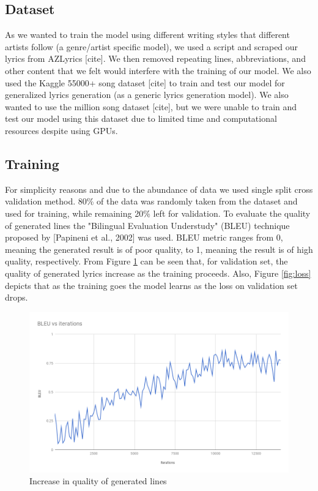 \documentclass{article}
\begin{document}
\subsection{Dataset}

As we wanted to train the model using different writing styles that different artists follow (a genre/artist specific model), we used a script and scraped our lyrics from AZLyrics [cite]. We then removed repeating lines, abbreviations, and other content that we felt would interfere with the training of our model. We also used the Kaggle 55000+ song dataset [cite] to train and test our model for generalized lyrics generation (as a generic lyrics generation model). We also wanted to use the million song dataset [cite], but we were unable to train and test our model using this dataset due to limited time and computational resources despite using GPUs.

\subsection{Training}
For simplicity reasons and due to the abundance of data we used single split cross validation method. 80\% of the data was randomly taken from the dataset and used for training, while remaining 20\% left for validation. To evaluate the quality of generated lines the "Bilingual Evaluation Understudy" (BLEU) technique proposed by [Papineni et al., 2002] was used. BLEU metric ranges from 0, meaning the generated result is of poor quality, to 1, meaning the result is of high quality, respectively. From Figure \ref{fig:bleu} can be seen that, for validation set, the quality of generated lyrics increase as the training proceeds. Also, Figure \ref{fig:loss} depicts that as the training goes the model learns as the loss on validation set drops.

\begin{figure}[!ht]
\centering
\includegraphics[scale=0.42]{bleu.png}
\caption{Increase in quality of generated lines}
\label{fig:bleu}
\end{figure}
\end{document}
